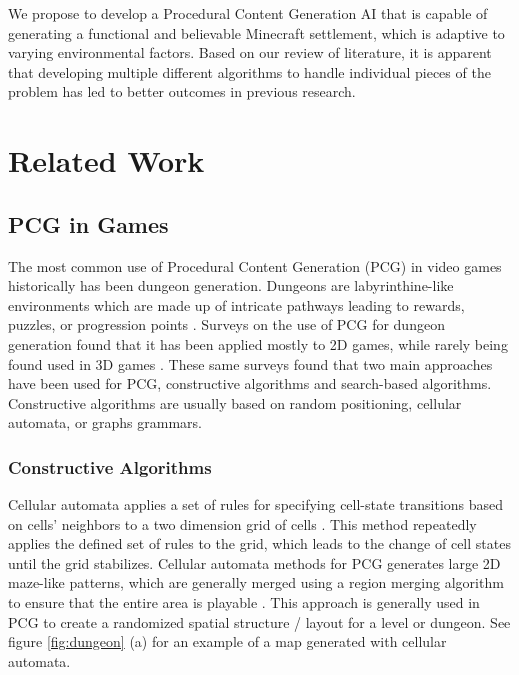\documentclass[11pt, oneside]{article}
\begin{document}
\begin{normalsize}
We propose to develop a Procedural Content Generation AI that is capable of generating a functional and believable Minecraft settlement, which is adaptive to varying environmental factors. Based on our review of literature, it is apparent that developing multiple different algorithms to handle individual pieces of the problem has led to better outcomes in previous research. 

\newpage

\section{Related Work}
\label{Related Work}

\subsection{PCG in Games}

The most common use of Procedural Content Generation (PCG) in video games historically has been dungeon generation. Dungeons are labyrinthine-like environments which are made up of intricate pathways leading to rewards, puzzles, or progression points \cite{van2013procedural}. Surveys on the use of PCG for dungeon generation found that it has been applied mostly to 2D games, while rarely being found used in 3D games \cite{viana2019survey}. These same surveys found that two main approaches have been used for PCG, constructive algorithms and search-based algorithms. Constructive algorithms are usually based on random positioning, cellular automata, or graphs grammars. 

\subsubsection{Constructive Algorithms}
Cellular automata applies a set of rules for specifying cell-state transitions based on cells' neighbors to a two dimension grid of cells \cite{adams2017procedural}. This method repeatedly applies the defined set of rules to the grid, which leads to the change of cell states until the grid stabilizes. Cellular automata methods for PCG generates large 2D maze-like patterns, which are generally merged using a region merging algorithm to ensure that the entire area is playable \cite{adams2017procedural}. This approach is generally used in PCG to create a randomized spatial structure / layout for a level or dungeon. See figure \ref{fig:dungeon} (a) for an example of a map generated with cellular automata.


\end{normalsize}
\end{document}
